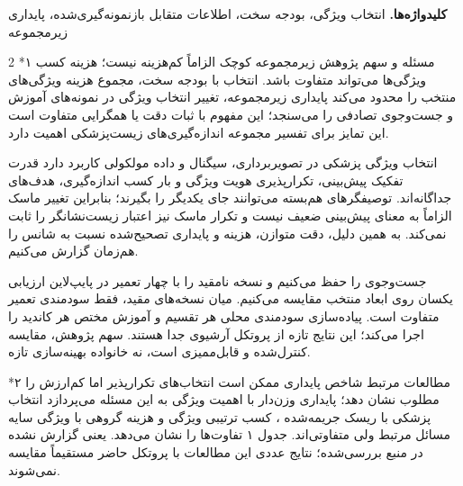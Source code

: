 \documentclass[10pt,a4paper]{article}
\makeatletter
\renewcommand{\section}{\@startsection{section}{1}{0pt}{5pt}{2pt}{\normalfont\normalsize\bfseries}}
\newcommand{\sect}[1]{\section*{#1}}
\makeatother
\begin{document}
\textbf{کلیدواژه‌ها. } انتخاب ویژگی، بودجه سخت، اطلاعات متقابل بازنمونه‌گیری‌شده، پایداری زیرمجموعه
\begin{multicols}{2}\raggedcolumns
\sect{۱  مسئله و سهم پژوهش}
زیرمجموعه کوچک الزاماً کم‌هزینه نیست؛ هزینه کسب ویژگی‌ها می‌تواند متفاوت باشد. انتخاب با بودجه سخت، مجموع هزینه ویژگی‌های منتخب را محدود می‌کند  پایداری زیرمجموعه، تغییر انتخاب ویژگی در نمونه‌های آموزش و جست‌وجوی تصادفی را می‌سنجد؛ این مفهوم با ثبات دقت یا همگرایی متفاوت است  این تمایز برای تفسیر مجموعه اندازه‌گیری‌های زیست‌پزشکی اهمیت دارد.

انتخاب ویژگی پزشکی در تصویربرداری، سیگنال و داده مولکولی کاربرد دارد  قدرت تفکیک پیش‌بینی، تکرارپذیری هویت ویژگی و بار کسب اندازه‌گیری، هدف‌های جداگانه‌اند. توصیفگرهای هم‌بسته می‌توانند جای یکدیگر را بگیرند؛ بنابراین تغییر ماسک الزاماً به معنای پیش‌بینی ضعیف نیست و تکرار ماسک نیز اعتبار زیست‌نشانگر را ثابت نمی‌کند. به همین دلیل، دقت متوازن، هزینه و پایداری تصحیح‌شده نسبت به شانس را هم‌زمان گزارش می‌کنیم.

جست‌وجوی  را حفظ می‌کنیم \lr{[4]} و نسخه نامقید را با چهار تعمیر در پایپ‌لاین ارزیابی یکسان روی ابعاد منتخب مقایسه می‌کنیم. میان نسخه‌های مقید، فقط سودمندی تعمیر متفاوت است. پیاده‌سازی  سودمندی محلی هر تقسیم و آموزش مختص هر کاندید را اجرا می‌کند؛ این نتایج تازه از پروتکل آرشیوی  جدا هستند. سهم پژوهش، مقایسه کنترل‌شده و قابل‌ممیزی است، نه خانواده بهینه‌سازی تازه.

\sect{۲  مطالعات مرتبط}
شاخص پایداری ممکن است انتخاب‌های تکرارپذیر اما کم‌ارزش را مطلوب نشان دهد؛ پایداری وزن‌دار با اهمیت ویژگی به این مسئله می‌پردازد  انتخاب پزشکی با ریسک جریمه‌شده \lr{[6]}، کسب ترتیبی ویژگی \lr{[7]} و هزینه گروهی با ویژگی سایه \lr{[8]} مسائل مرتبط ولی متفاوتی‌اند. جدول ۱ تفاوت‌ها را نشان می‌دهد.  یعنی گزارش نشده در منبع بررسی‌شده؛ نتایج عددی این مطالعات با پروتکل حاضر مستقیماً مقایسه نمی‌شوند.


\end{multicols}
\end{document}
